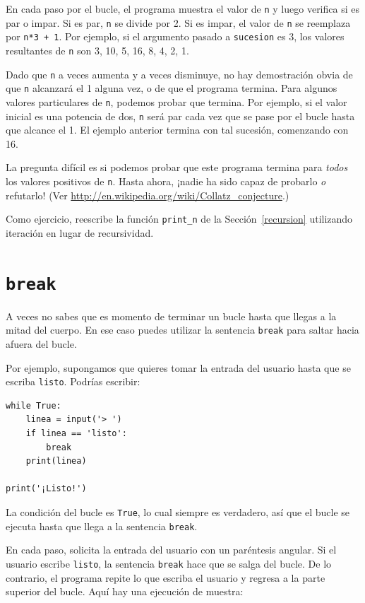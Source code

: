 \documentclass[10pt]{book}
\begin{document}
En cada paso por el bucle, el programa muestra el valor de {\tt n}
y luego verifica si es par o impar.  Si es par, {\tt n} se
divide por 2.  Si es impar, el valor de {\tt n} se reemplaza por
{\tt n*3 + 1}. Por ejemplo, si el argumento pasado a {\tt sucesion}
es 3, los valores resultantes de {\tt n} son 3, 10, 5, 16, 8, 4, 2, 1.

Dado que {\tt n} a veces aumenta y a veces disminuye, no hay
demostración obvia de que {\tt n} alcanzará el 1 alguna vez, o de que el programa
termina.  Para algunos valores particulares de {\tt n}, podemos probar que
termina.  Por ejemplo, si el valor inicial es una potencia de dos,
{\tt n} será par cada vez que se pase por el bucle
hasta que alcance el 1. El ejemplo anterior termina con tal sucesión,
comenzando con 16.

La pregunta difícil es si podemos probar que este programa termina
para {\em todos} los valores positivos de {\tt n}.  Hasta ahora, ¡nadie ha
sido capaz de probarlo {\em o} refutarlo!  (Ver
  \url{http://en.wikipedia.org/wiki/Collatz_conjecture}.)

Como ejercicio, reescribe la función \verb"print_n" de la
Sección~\ref{recursion} utilizando iteración en lugar de recursividad.


\section{{\tt break}}

A veces no sabes que es momento de terminar un bucle hasta que llegas a la mitad
del cuerpo.  En ese caso puedes utilizar la sentencia {\tt break}
para saltar hacia afuera del bucle.

Por ejemplo, supongamos que quieres tomar la entrada del usuario hasta que
se escriba {\tt listo}.    Podrías escribir:

\begin{verbatim}
while True:
    linea = input('> ')
    if linea == 'listo':
        break
    print(linea)

print('¡Listo!')
\end{verbatim}
%
La condición del bucle es {\tt True}, lo cual siempre es verdadero, así que el
bucle se ejecuta hasta que llega a la sentencia {\tt break}.

En cada paso, solicita la entrada del usuario con un paréntesis angular.
Si el usuario escribe {\tt listo}, la sentencia {\tt break} hace que se salga
del bucle.  De lo contrario, el programa repite lo que escriba el usuario
y regresa a la parte superior del bucle.  Aquí hay una ejecución de muestra:
\end{document}
